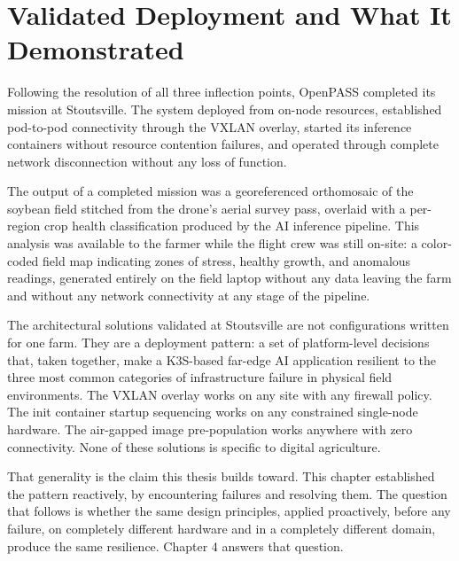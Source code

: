 \section{Validated Deployment and What It Demonstrated}
\label{sec:ch3_validated}
Following the resolution of all three inflection points, OpenPASS completed its mission at Stoutsville. The system deployed from on-node resources, established pod-to-pod connectivity through the VXLAN overlay, started its inference containers without resource contention failures, and operated through complete network disconnection without any loss of function.

The output of a completed mission was a georeferenced orthomosaic of the soybean field stitched from the drone's aerial survey pass, overlaid with a per-region crop health classification produced by the AI inference pipeline. This analysis was available to the farmer while the flight crew was still on-site: a color-coded field map indicating zones of stress, healthy growth, and anomalous readings, generated entirely on the field laptop without any data leaving the farm and without any network connectivity at any stage of the pipeline.

The architectural solutions validated at Stoutsville are not configurations written for one farm. They are a deployment pattern: a set of platform-level decisions that, taken together, make a K3S-based far-edge AI application resilient to the three most common categories of infrastructure failure in physical field environments. The VXLAN overlay works on any site with any firewall policy. The init container startup sequencing works on any constrained single-node hardware. The air-gapped image pre-population works anywhere with zero connectivity. None of these solutions is specific to digital agriculture.

That generality is the claim this thesis builds toward. This chapter established the pattern reactively, by encountering failures and resolving them. The question that follows is whether the same design principles, applied proactively, before any failure, on completely different hardware and in a completely different domain, produce the same resilience. Chapter 4 answers that question.